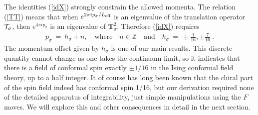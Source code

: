 \documentclass[11pt]{article}
\newcommand{\T}{{{\cal T}}} %
\newcommand{\modT}{{\mathbf{T}}}
\newcommand{\dave}[1]{{\color{red}\footnotesize{(DA) #1}}}
\newcommand{\paul}[1]{{\color{blue}\footnotesize{(PF) #1}}}
\numberwithin{equation}{section}		%
\begin{document}
The identities (\ref{idX}) strongly constrain the allowed momenta. The relation (\ref{TT})  means that when $e^{2\pi ip_\sigma/L_{\rm eff}}$ is an eigenvalue of the translation operator $\T_\sigma$,  then $e^{4\pi i p_\sigma}$ is an eigenvalue of $\modT_\sigma^2$. Therefore  (\ref{idX}) requires 
\begin{align}
p_\sigma \ =\  h_\sigma + n, \quad \text{where} \quad n \in \mathbb{Z} \quad \text{and} \quad h_\sigma \ =\ \pm \frac{1}{16}, \pm \frac{7}{16}\ . 
\end{align}
The momentum offset given by $h_\sigma$ is one of our main results. This discrete quantity cannot change as one takes the continuum limit, so it indicates that there is a field of conformal spin exactly $\pm 1/16$ in
the Ising conformal field theory, up to a half integer. It of course has long been known that the chiral part of the spin field indeed has conformal spin 1/16, but our derivation required none of the detailed apparatus of integrability, just simple manipulations using the $F$ moves.
We will explore this and other consequences in detail in the next section.%



\end{document}
